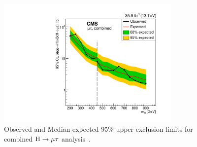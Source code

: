 \begin{figure}[!htpb]
\centering
 \includegraphics[width=0.8\textwidth]{plots_and_figures/chapter8/highmass/Figure_005-c.pdf}
\caption{Observed and Median expected 95\% upper exclusion limits for combined $\text{H} \to \mu \tau$ analysis~\cite{HIG-18-017}.}
 \label{fig:limits_Hmu}
\end{figure}



%
% 
% 

